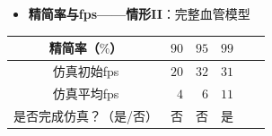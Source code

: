 \begin{frame}
\begin{itemize}
  \item \textbf{精简率与fps——情形II}：完整血管模型
\end{itemize}
\begin{table}[t]
\renewcommand{\arraystretch}{0.5}
\centering
\begin{tabular*}{80mm}{c r r r r r}
\toprule
\hspace{5mm} \small{精简率（$\%$）}           & \small{$90$} & \small{$95$} & \small{$99$} \\
\midrule
\hspace{5mm} \small{仿真初始fps}              & \small{$20$} & \small{$32$} & \small{$31$} \\
\midrule
\hspace{5mm} \small{仿真平均fps}              &  \small{$4$} &  \small{$6$} & \small{$11$} \\
\midrule
\hspace{5mm} \small{是否完成仿真？（是/否）}  &  \small{否}  &  \small{否}  & \small{是}   \\
\bottomrule
\end{tabular*}
\end{table}
\end{frame}


